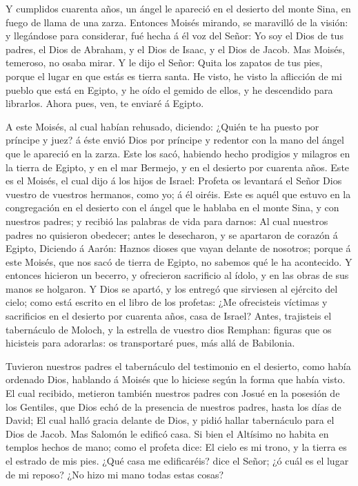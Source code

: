  Y cumplidos cuarenta años, un ángel le apareció en el
desierto del monte Sina, en fuego de llama de una zarza. 
Entonces Moisés mirando, se maravilló de la visión: y llegándose para
considerar, fué hecha á él voz del Señor:  Yo soy el Dios
de tus padres, el Dios de Abraham, y el Dios de Isaac, y el Dios de
Jacob. Mas Moisés, temeroso, no osaba mirar.  Y le dijo el
Señor: Quita los zapatos de tus pies, porque el lugar en que estás es
tierra santa.  He visto, he visto la aflicción de mi pueblo
que está en Egipto, y he oído el gemido de ellos, y he descendido para
librarlos. Ahora pues, ven, te enviaré á Egipto.

 A este Moisés, al cual habían rehusado, diciendo: ¿Quién
te ha puesto por príncipe y juez? á éste envió Dios por príncipe y
redentor con la mano del ángel que le apareció en la zarza.
 Este los sacó, habiendo hecho prodigios y milagros en la
tierra de Egipto, y en el mar Bermejo, y en el desierto por cuarenta
años.  Este es el Moisés, el cual dijo á los hijos de
Israel: Profeta os levantará el Señor Dios vuestro de vuestros hermanos,
como yo; á él oiréis.  Este es aquél que estuvo en la
congregación en el desierto con el ángel que le hablaba en el monte
Sina, y con nuestros padres; y recibió las palabras de vida para darnos:
 Al cual nuestros padres no quisieron obedecer; antes le
desecharon, y se apartaron de corazón á Egipto,  Diciendo á
Aarón: Haznos dioses que vayan delante de nosotros; porque á este
Moisés, que nos sacó de tierra de Egipto, no sabemos qué le ha
acontecido.  Y entonces hicieron un becerro, y ofrecieron
sacrificio al ídolo, y en las obras de sus manos se holgaron.
 Y Dios se apartó, y los entregó que sirviesen al ejército
del cielo; como está escrito en el libro de los profetas: ¿Me
ofrecisteis víctimas y sacrificios en el desierto por cuarenta años,
casa de Israel?  Antes, trajisteis el tabernáculo de
Moloch, y la estrella de vuestro dios Remphan: figuras que os hicisteis
para adorarlas: os transportaré pues, más allá de Babilonia.

 Tuvieron nuestros padres el tabernáculo del testimonio en
el desierto, como había ordenado Dios, hablando á Moisés que lo hiciese
según la forma que había visto.  El cual recibido, metieron
también nuestros padres con Josué en la posesión de los Gentiles, que
Dios echó de la presencia de nuestros padres, hasta los días de David;
 El cual halló gracia delante de Dios, y pidió hallar
tabernáculo para el Dios de Jacob.  Mas Salomón le edificó
casa.  Si bien el Altísimo no habita en templos hechos de
mano; como el profeta dice:  El cielo es mi trono, y la
tierra es el estrado de mis pies. ¿Qué casa me edificaréis? dice el
Señor; ¿ó cuál es el lugar de mi reposo?  ¿No hizo mi mano
todas estas cosas?

